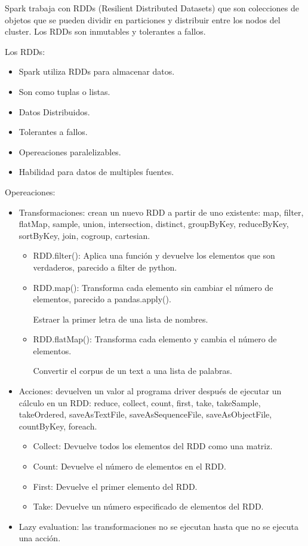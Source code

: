 \documentclass[../main.tex]{subfiles}
\begin{document}
    Spark trabaja con RDDs (Resilient Distributed Datasets) que son colecciones de objetos que se pueden dividir en particiones y distribuir entre los nodos del cluster. Los RDDs son inmutables y tolerantes a fallos.

    Los RDDs:
    \begin{itemize}
        \item Spark utiliza RDDs para almacenar datos.
        \item Son como tuplas o listas.
        \item Datos Distribuidos.
        \item Tolerantes a fallos.
        \item Opereaciones paralelizables.
        \item Habilidad para datos de multiples fuentes.
    \end{itemize}

    Opereaciones:
    \begin{itemize}
        \item Transformaciones: crean un nuevo RDD a partir de uno existente: map, filter, flatMap, sample, union, intersection, distinct, groupByKey, reduceByKey, sortByKey, join, cogroup, cartesian.
            \begin{itemize}
                \item RDD.filter(): Aplica una función y devuelve los elementos que son verdaderos, parecido a filter de python.
                \item RDD.map(): Transforma cada elemento sin cambiar el número de elementos, parecido a pandas.apply().
                
                Estraer la primer letra de una lista de nombres.
                \item RDD.flatMap(): Transforma cada elemento y cambia el número de elementos.
                
                Convertir el corpus de un text a una lista de palabras.
            \end{itemize}
        \item Acciones: devuelven un valor al programa driver después de ejecutar un cálculo en un RDD: reduce, collect, count, first, take, takeSample, takeOrdered, saveAsTextFile, saveAsSequenceFile, saveAsObjectFile, countByKey, foreach.
            \begin{itemize}
                \item Collect: Devuelve todos los elementos del RDD como una matriz.
                \item Count: Devuelve el número de elementos en el RDD.
                \item First: Devuelve el primer elemento del RDD.
                \item Take: Devuelve un número especificado de elementos del RDD.
            \end{itemize}
        \item Lazy evaluation: las transformaciones no se ejecutan hasta que no se ejecuta una acción.
    \end{itemize}
\end{document}
